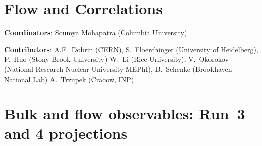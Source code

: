 \documentclass[../report.tex]{subfiles}
\providecommand{\main}{..}
\begin{document}
\section{Flow and Correlations}
\label{sec:flow}

{ \small
\noindent \textbf{Coordinators}: Soumya Mohapatra (Columbia University)

\noindent \textbf{Contributors}: 
A.F.~Dobrin (CERN), 
S.~Floerchinger (University of Heidelberg), 
P.~Huo (Stony Brook University)
W.~Li (Rice University), 
V.~Okorokov (National Research Nuclear University MEPhI), 
B.~Schenke (Brookhaven National Lab)
A.~Trzupek (Cracow, INP)
}

\FloatBarrier
\section{Bulk and flow observables: Run~3 and 4 projections}
\FloatBarrier
\FloatBarrier
\FloatBarrier
\FloatBarrier
\FloatBarrier
\end{document}
